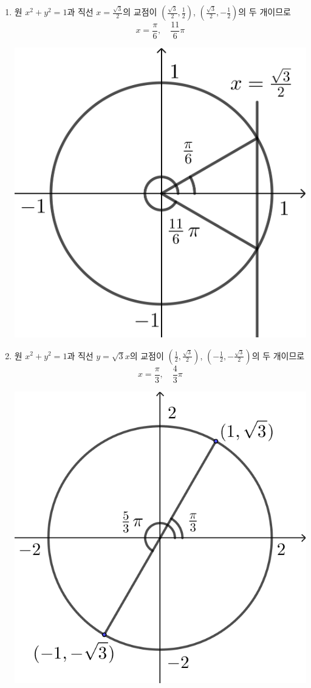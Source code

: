 \documentclass{oblivoir}
\begin{document}
\begin{mdframed}[frametitle=삼각함수의 정의를 사용하는 방법]
\begin{enumerate}
\item
\par\noindent
\begin{minipage}[t]{.6\textwidth}
원 \(x^2+y^2=1\)과 직선 \(x=\frac{\sqrt3}2\)의 교점이 \((\frac{\sqrt3}2,\frac12)\), \((\frac{\sqrt3}2,-\frac12)\)의 두 개이므로
\[x=\frac\pi6,\quad\frac{11}6\pi\]
\end{minipage}
\begin{minipage}{.4\textwidth}\centering
\includegraphics[width=.6\textwidth]{equa_1-1}
\end{minipage}
\item
\par\noindent
\begin{minipage}[t]{.6\textwidth}
원 \(x^2+y^2=1\)과 직선 \(y=\sqrt3x\)의 교점이 \((\frac12,\frac{\sqrt3}2)\), \((-\frac12,-\frac{\sqrt3}2)\)의 두 개이므로
\[x=\frac\pi3,\quad\frac43\pi\]
\end{minipage}
\begin{minipage}{.4\textwidth}\centering
\includegraphics[width=.6\textwidth]{equa_1-2}
\end{minipage}
\end{enumerate}
\end{mdframed}
\end{document}
